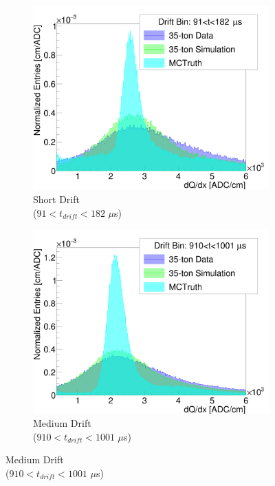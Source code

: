 \documentclass[10pt,a4paper]{article}
\begin{document}
\begin{figure}
\centering
\begin{subfigure}{0.33\linewidth}
\centering
\includegraphics[width=\textwidth]{short_dqdx.png}
\caption{Short Drift\\ ($91< t_{drift}< 182$ $\mu$s)}
\label{fig:short_dqdx}
\end{subfigure}\hfill
\begin{subfigure}{0.33\linewidth}
\centering
\includegraphics[width=\textwidth]{middle_dqdx.png}
\caption{Medium Drift\\ ($910<t_{drift}<1001$ $\mu$s)}
\label{fig:middle_dqdx}
\end{subfigure}\hfill

\end{figure}
\end{document}
